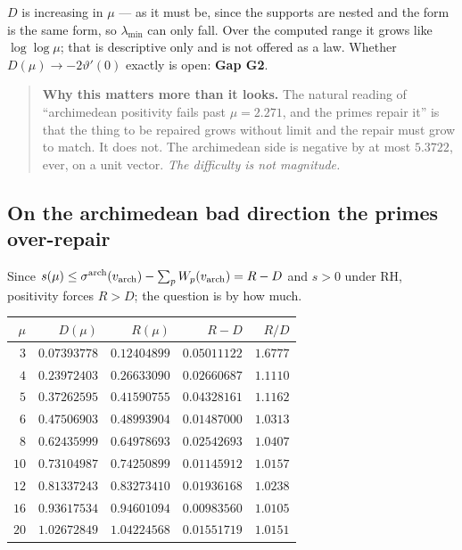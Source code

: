 \documentclass[11pt,a4paper]{article}
\theoremstyle{plain}
\theoremstyle{definition}
\theoremstyle{remark}
\begin{document}
$D$ is increasing in $\mu$ --- as it must be, since the supports are nested and
the form is the same form, so $\lambda_{\min}$ can only fall.  Over the computed
range it grows like $\log\log\mu$; that is descriptive only and is not offered
as a law.  Whether $D(\mu)\to-2\vartheta'(0)$ exactly is open: \textbf{Gap G2}.

\begin{quote}
\textbf{Why this matters more than it looks.}  The natural reading of
``archimedean positivity fails past $\mu=2.271$, and the primes repair it'' is
that the thing to be repaired grows without limit and the repair must grow to
match.  It does not.  The archimedean side is negative by at most $5.3722$,
ever, on a unit vector.  \emph{The difficulty is not magnitude.}
\end{quote}

\subsection{On the archimedean bad direction the primes over-repair}

Since $s(\mu)\le\sigma^{\mathrm{arch}}(v_{\rm arch})-\sum_pW_p(v_{\rm arch})=R-D$
and $s>0$ under RH, positivity forces $R>D$; the question is by how much.

\begin{center}\small
\begin{tabular}{@{}rrrrr@{}}
\hline
$\mu$ & $D(\mu)$ & $R(\mu)$ & $R-D$ & $R/D$ \\
\hline
$3$ & $0.07393778$ & $0.12404899$ & $0.05011122$ & $1.6777$ \\
$4$ & $0.23972403$ & $0.26633090$ & $0.02660687$ & $1.1110$ \\
$5$ & $0.37262595$ & $0.41590755$ & $0.04328161$ & $1.1162$ \\
$6$ & $0.47506903$ & $0.48993904$ & $0.01487000$ & $1.0313$ \\
$8$ & $0.62435999$ & $0.64978693$ & $0.02542693$ & $1.0407$ \\
$10$ & $0.73104987$ & $0.74250899$ & $0.01145912$ & $1.0157$ \\
$12$ & $0.81337243$ & $0.83273410$ & $0.01936168$ & $1.0238$ \\
$16$ & $0.93617534$ & $0.94601094$ & $0.00983560$ & $1.0105$ \\
$20$ & $1.02672849$ & $1.04224568$ & $0.01551719$ & $1.0151$ \\
\hline
\end{tabular}
\end{center}
\end{document}
